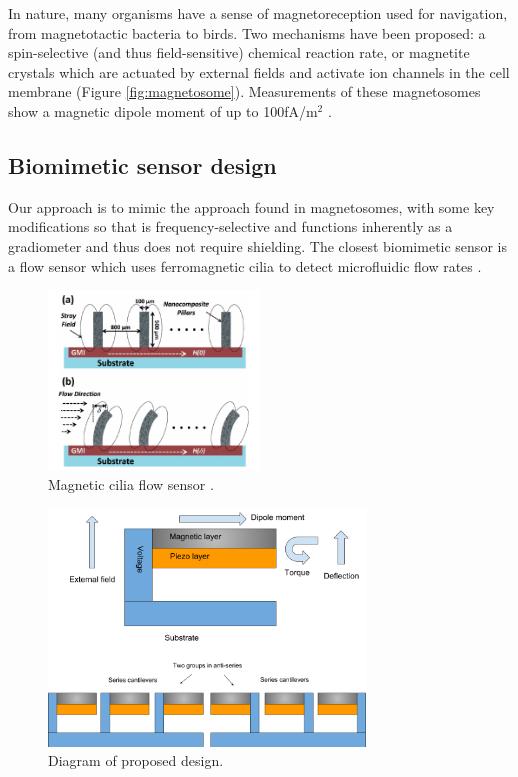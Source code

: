 In nature, many organisms have a sense of magnetoreception used for navigation, from magnetotactic bacteria to birds. Two mechanisms have been proposed: a spin-selective (and thus field-sensitive) chemical reaction rate, or magnetite crystals which are actuated by external fields and activate ion channels in the cell membrane (Figure \ref{fig:magnetosome})\cite{johnsen2005physics,dodson2013radical,kirschvink2001magnetite}. Measurements of these magnetosomes show a magnetic dipole moment of up to 100fA/m$^2$ \cite{hanzlik2002pulsed,eder2012magnetic}.

\subsection{Biomimetic sensor design}

Our approach is to mimic the approach found in magnetosomes, with some key modifications so that is frequency-selective and functions inherently as a gradiometer and thus does not require shielding. The closest biomimetic sensor is a flow sensor which uses ferromagnetic cilia to detect microfluidic flow rates \cite{alfadhel2014magnetic}.

\begin{figure}[h]
\centering
\includegraphics[width=0.5\textwidth]{cilia}
\caption{Magnetic cilia flow sensor \cite{alfadhel2014magnetic}.}
\label{fig:cilia}
\end{figure}

\begin{figure}
\centering
\includegraphics[width=0.75\textwidth]{biomag}
\caption{Diagram of proposed design.}
\label{fig:diagram}
\end{figure}

